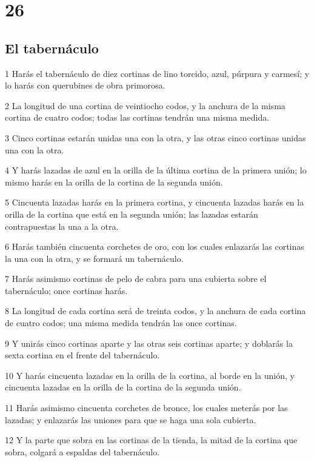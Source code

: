 \chapter{26}

\section*{El tabernáculo}

\par 1 Harás el tabernáculo de diez cortinas de lino torcido, azul, púrpura y carmesí; y lo harás con querubines de obra primorosa.
\par 2 La longitud de una cortina de veintiocho codos,  y la anchura de la misma cortina de cuatro codos; todas las cortinas tendrán una misma medida.
\par 3 Cinco cortinas estarán unidas una con la otra, y las otras cinco cortinas unidas una con la otra.
\par 4 Y harás lazadas de azul en la orilla de la última cortina de la primera unión; lo mismo harás en la orilla de la cortina de la segunda unión.
\par 5 Cincuenta lazadas harás en la primera cortina, y cincuenta lazadas harás en la orilla de la cortina que está en la segunda unión; las lazadas estarán contrapuestas la una a la otra.
\par 6 Harás también cincuenta corchetes de oro, con los cuales enlazarás las cortinas la una con la otra, y se formará un tabernáculo.
\par 7 Harás asimismo cortinas de pelo de cabra para una cubierta sobre el tabernáculo; once cortinas harás.
\par 8 La longitud de cada cortina será de treinta codos,  y la anchura de cada cortina de cuatro codos; una misma medida tendrán las once cortinas.
\par 9 Y unirás cinco cortinas aparte y las otras seis cortinas aparte; y doblarás la sexta cortina en el frente del tabernáculo.
\par 10 Y harás cincuenta lazadas en la orilla de la cortina, al borde en la unión, y cincuenta lazadas en la orilla de la cortina de la segunda unión.
\par 11 Harás asimismo cincuenta corchetes de bronce, los cuales meterás por las lazadas; y enlazarás las uniones para que se haga una sola cubierta.
\par 12 Y la parte que sobra en las cortinas de la tienda, la mitad de la cortina que sobra, colgará a espaldas del tabernáculo.
